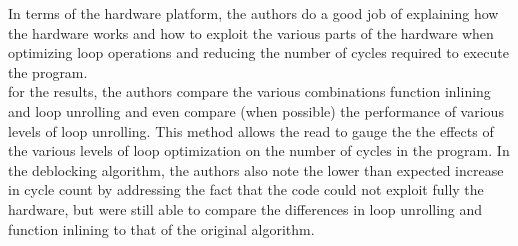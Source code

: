 \documentclass[letterpaper,10pt,titlepage]{article}
\begin{document}
In terms of the hardware platform, the authors do a good job of explaining 
how the hardware works and how to exploit the various parts of the hardware 
when optimizing loop operations and reducing the number of cycles required 
to execute the program.\\

for the results, the authors compare the various combinations function 
inlining and loop unrolling and even compare (when possible) the performance 
of various levels of loop unrolling. This method allows the read to gauge the 
the effects of the various levels of loop optimization on the number of 
cycles in the program. In the deblocking algorithm, the authors also note the 
lower than expected increase in cycle count by addressing the fact that the 
code could not exploit fully the hardware, but were still able to compare the 
differences in loop unrolling and function inlining to that of the original 
algorithm.
\newpage



\end{document}
